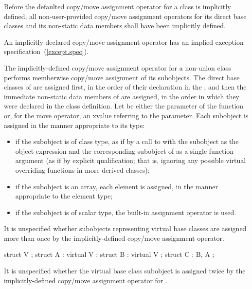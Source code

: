 \pnum
Before the defaulted copy/move assignment operator for a class is
implicitly defined,
all non-user-provided copy/move assignment operators for
its direct base classes and
its non-static data members shall have been implicitly defined.
\begin{note}
An implicitly-declared copy/move assignment operator has an
implied exception specification~(\ref{except.spec}).
\end{note}

\pnum
The implicitly-defined copy/move assignment operator for a
non-union class  performs memberwise copy/move assignment of its subobjects. The direct
base classes of  are assigned first, in the order of their declaration in the
, and then the immediate non-static data members of
 are assigned, in the order in which they were declared in the class
definition.
Let  be either the parameter of the function or, for the move operator, an
xvalue referring to the parameter.
Each subobject is assigned in the manner appropriate to its type:

\begin{itemize}
\item
if the subobject is of class type,
as if by a call to  with the subobject as the object expression
and the corresponding subobject of  as a single function argument
(as if by explicit qualification; that is,
ignoring any possible virtual overriding functions in more derived classes);
\item
if the subobject is an array, each element is assigned,
in the manner appropriate to the element type;
\item
if the subobject is of scalar type,
the built-in assignment operator is used.
\end{itemize}

%
It is unspecified whether subobjects representing virtual base classes
are assigned more than once by the implicitly-defined copy/move assignment
operator.
\begin{example}

\begin{codeblock}
struct V { };
struct A : virtual V { };
struct B : virtual V { };
struct C : B, A { };
\end{codeblock}

It is unspecified whether the virtual base class subobject
is assigned twice by the implicitly-defined copy/move assignment operator for
.
\end{example}

